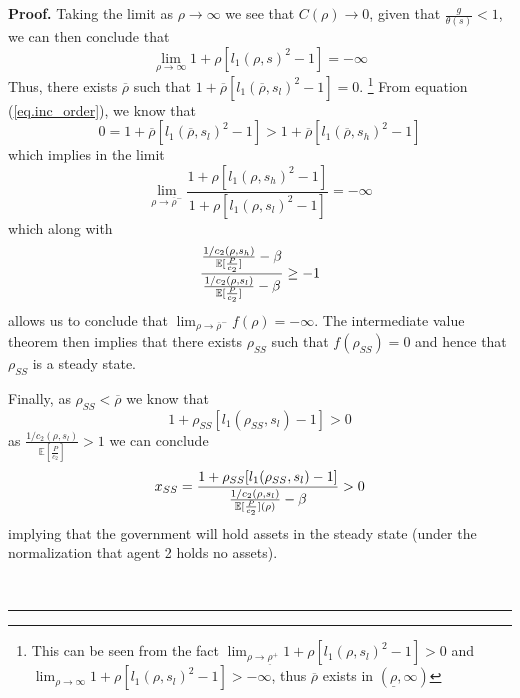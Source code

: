 \documentclass[thmsb,11pt]{article}
\newenvironment{proof}[1][Proof]{\noindent \textbf{#1.} }{\  \rule{0.5em}{0.5em}}
\begin{document}
\begin{proof}
Taking the limit as $\rho\rightarrow\infty$ we see that $C(\rho)\rightarrow
0 $, given that $\frac g{\theta(s)} <1$, we can then conclude that
\begin{equation*}
\lim_{\rho\rightarrow\infty } 1+ \rho[l_1(\rho,s)^2-1] = -\infty
\end{equation*}
Thus, there exists $\overline \rho$ such that $1+\overline \rho[%
l_1(\overline \rho,s_l)^2-1] = 0$. \footnote{This can be seen from the fact $\lim_{\rho\rightarrow \underline
\rho^+} 1+\rho[l_1(\rho,s_l)^2 -1] > 0$ and $\lim_{\rho\rightarrow \infty } 1+\rho[l_1(\rho,s_l)^2 -1] > -\infty$, thus $\overline{\rho}$ exists in $(\underline{\rho},\infty)$ } From equation (\ref{eq.inc_order}), we
know that
\begin{equation*}
0 = 1+\overline \rho[l_1(\overline \rho,s_l)^2-1] > 1+\overline \rho[%
l_1(\overline \rho,s_h)^2-1]
\end{equation*}
which implies in the limit
\begin{equation*}
\lim_{\rho\rightarrow \overline \rho^-}\frac{1+\rho[l_1(\rho,s_h)^2-1]}{1+%
\rho[l_1(\rho,s_l)^2-1]} = -\infty
\end{equation*}
which along with
\begin{equation*}
\frac{\frac{1/c_2(\rho,s_h)}{\mathbb{E}[\frac{P}{c_2}]}-\beta }{\frac{%
1/c_2(\rho,s_l)}{\mathbb{E}[\frac{P}{c_2}]}-\beta} \geq -1
\end{equation*}
allows us to conclude that $\lim_{\rho\rightarrow \overline \rho^-} f(\rho)
= -\infty$. The intermediate value theorem then implies that there exists $%
\rho_{SS}$ such that $f(\rho_{SS}) = 0$ and hence that $\rho_{SS}$ is a
steady state.

Finally, as $\rho_{SS} < \overline \rho$ we know that
\begin{equation*}
1+\rho_{SS}[l_1(\rho_{SS},s_l)-1] >0
\end{equation*}%
as $\frac{1/c_2(\rho,s_l)}{\mathbb{E}[\frac{P}{c_2}]} >1$ we can
conclude
\begin{equation*}
x_{SS} = \frac{1+\rho_{SS}[l_1(\rho_{SS},s_l)-1]}{\frac{1/c_2(\rho,s_l)}{%
\mathbb{E}[\frac{P}{c_2}](\rho)}-\beta} >0
\end{equation*}%
implying that the government will hold assets in the steady state (under the
normalization that agent 2 holds no assets).


\end{proof}
\end{document}
